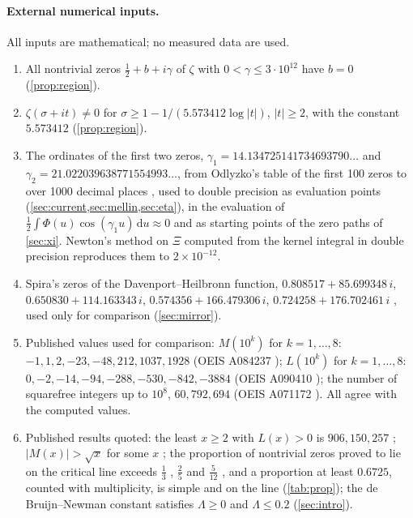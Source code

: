 \documentclass[11pt]{article}
\theoremstyle{definition}\newtheorem{definition}[theorem]{Definition}
\theoremstyle{remark}\newtheorem{remark}[theorem]{Remark}
\newcommand{\dd}{\,\mathrm d}\newcommand{\e}{\mathrm e}
\begin{document}
\paragraph{External numerical inputs.} All inputs are mathematical; no measured data are used.
\begin{enumerate}[label=(\roman*)]
\item All nontrivial zeros $\frac12+b+i\gamma$ of $\zeta$ with $0<\gamma\le3\cdot10^{12}$ have $b=0$ \cite{PT} (\cref{prop:region}).
\item $\zeta(\sigma+it)\ne0$ for $\sigma\ge1-1/(5.573412\log|t|)$, $|t|\ge2$, with the constant $5.573412$ \cite{MT} (\cref{prop:region}).
\item The ordinates of the first two zeros, $\gamma_1=14.134725141734693790\ldots$ and $\gamma_2=21.022039638771554993\ldots$, from Odlyzko's table of the first 100 zeros to over 1000 decimal places \cite{Odlyzko}, used to double precision as evaluation points (\cref{sec:current,sec:mellin,sec:eta}), in the evaluation of $\frac12\int\Phi(u)\cos(\gamma_1u)\dd u\approx0$ and as starting points of the zero paths of \cref{sec:xi}. Newton's method on $\Xi$ computed from the kernel integral in double precision reproduces them to $2\times10^{-12}$.
\item Spira's zeros of the Davenport--Heilbronn function, $0.808517+85.699348\,i$, $0.650830+114.163343\,i$, $0.574356+166.479306\,i$, $0.724258+176.702461\,i$ \cite{Spira}, used only for comparison (\cref{sec:mirror}).
\item Published values used for comparison: $M(10^k)$ for $k=1,\dots,8$: $-1,1,2,-23,-48,212,1037,1928$ (OEIS A084237 \cite{OEISM}); $L(10^k)$ for $k=1,\dots,8$: $0,-2,-14,-94,-288,-530,-842,-3884$ (OEIS A090410 \cite{OEISL}); the number of squarefree integers up to $10^8$, $60{,}792{,}694$ (OEIS A071172 \cite{OEISQ}). All agree with the computed values.
\item Published results quoted: the least $x\ge2$ with $L(x)>0$ is $906{,}150{,}257$ \cite{Tanaka}; $|M(x)|>\sqrt x$ for some $x$ \cite{OdlyzkoteRiele}; the proportion of nontrivial zeros proved to lie on the critical line exceeds $\frac13$ \cite{Levinson}, $\frac25$ \cite{Conrey} and $\frac5{12}$ \cite{PRZZ}, and a proportion at least $0.6725$, counted with multiplicity, is simple and on the line \cite{AF} (\cref{tab:prop}); the de Bruijn--Newman constant satisfies $\Lambda\ge0$ \cite{RT} and $\Lambda\le0.2$ \cite[Cor.~2]{PT} (\cref{sec:intro}).
\end{enumerate}
\end{document}
